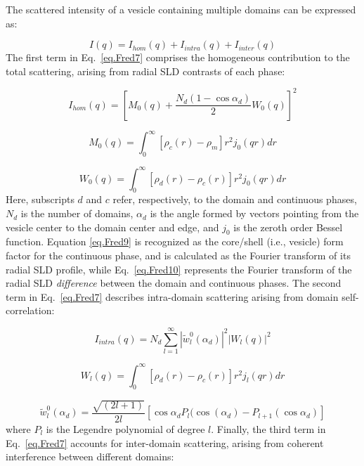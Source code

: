 \documentclass[8.5pt,twoside,twocolumn]{article}
\begin{document}
	The scattered intensity of a vesicle containing multiple domains can be expressed as:

\begin{equation}
\label{eq.Fred7}
	I(q) = I_{hom}(q) +I_{intra}(q) + I_{inter}(q)
\end{equation}
The first term in Eq.~\ref{eq.Fred7} comprises the homogeneous contribution to the total scattering, arising from radial SLD contrasts of each phase:


\begin{equation}
\label{eq.Fred8}
	I_{hom}(q) = \left[M_0(q) + \frac{N_d(1-\cos\alpha_d)}{2}W_0(q)\right]^2
\end{equation}

\begin{equation}
\label{eq.Fred9}
	M_0(q) = \int^{\infty}_0 [\rho_c(r)-\rho_m]r^2j_0(qr)dr
\end{equation}


\begin{equation}
\label{eq.Fred10}
	W_0(q) = \int^{\infty}_0 [\rho_d(r)-\rho_c(r)]r^2j_0(qr)dr
\end{equation}
Here, subscripts $d$ and $c$ refer, respectively, to the domain and continuous phases, $N_d$ is the number of domains, $\alpha_d$ is the angle formed by vectors pointing from the vesicle center to the domain center and edge, and $j_0$ is the zeroth order Bessel function. Equation \ref{eq.Fred9} is recognized as the core/shell (i.e., vesicle) form factor for the continuous phase, and is calculated as the Fourier transform of its radial SLD profile, while Eq.~\ref{eq.Fred10} represents the Fourier transform of the radial SLD \emph{difference} between the domain and continuous phases. The second term in Eq.~\ref{eq.Fred7} describes intra-domain scattering arising from domain self-correlation:

\begin{equation}
\label{eq.Fred11}
	I_{intra}(q) = N_d \sum_{l=1}^{\infty}|\tilde{w}_l^0(\alpha_d)|^2|W_l(q)|^2
\end{equation}

\begin{equation}
\label{eq.Fred12}
	W_l(q) = \int^{\infty}_0 [\rho_d(r)-\rho_c(r)]r^2j_l(qr)dr
\end{equation}


\begin{equation}
\label{eq.Fred13}
	\tilde{w}_l^0(\alpha_d) = \frac{\sqrt{(2l+1)}}{2l}[\cos\alpha_dP_l(\cos(\alpha_d)- P_{l+1}(\cos\alpha_d)]
\end{equation}
where $P_l$ is the Legendre polynomial of degree $l$. Finally, the third term in Eq.~\ref{eq.Fred7} accounts for inter-domain scattering, arising from coherent interference between different domains:
\end{document}
